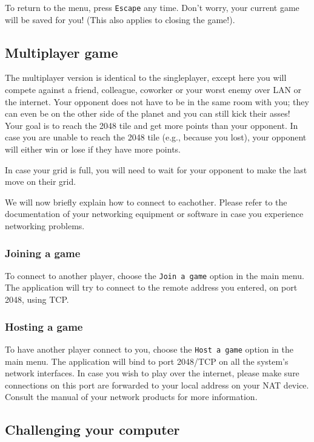 \documentclass[a4paper,11pt,report]{scrartcl}
\begin{document}
To return to the menu, press \texttt{Escape} any time. Don't worry,
your current game will be saved for you! (This also applies to closing the
game!).

\subsection{Multiplayer game}
The multiplayer version is identical to the singleplayer, except here you will
compete against a friend, colleague, coworker or your worst enemy over LAN or
the internet. Your opponent does not have to be in the same room with you; they
can even be on the other side of the planet and you can still kick their
asses!\\

Your goal is to reach the 2048 tile and get more points than your opponent.  In case you
are unable to reach the 2048 tile (e.g., because you lost), your opponent will either win or lose if they have more points. 

In case your grid is full, you will need to wait for your opponent to make the last move on their grid.

We will now briefly explain how to connect to eachother. Please refer to the
documentation of your networking equipment or software in case you experience
networking problems.

\subsubsection{Joining a game}
To connect to another player, choose the \texttt{Join a game} option in the
main menu. The application will try to connect to the remote address you
entered, on port 2048, using TCP.

\subsubsection{Hosting a game}
To have another player connect to you, choose the \texttt{Host a game} option
in the main menu. The application will bind to port 2048/TCP on all the
system's network interfaces. In case you wish to play over the internet,
please make sure connections on this port are forwarded to your local address
on your NAT device. Consult the manual of your network products for more 
information.


\subsection{Challenging your computer}
\end{document}
